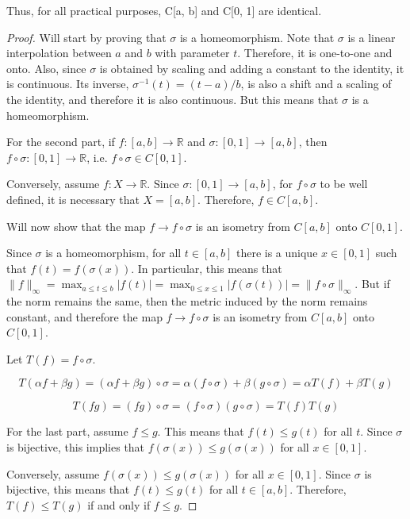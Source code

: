 Thus, for all  practical  purposes, C[a, b] and C[0, 1] are  identical. 

\begin{proof}
Will start by proving that $\sigma$ is a homeomorphism. Note that $\sigma$ is a linear interpolation between $a$ and $b$ with parameter $t$. Therefore, it is one-to-one and onto. Also, since $\sigma$ is obtained by scaling and adding a constant to the identity, it is continuous. Its inverse, $\sigma^{-1}(t) = (t - a) / b$, is also a shift and a scaling of the identity, and therefore it is also continuous. But this means that $\sigma$ is a homeomorphism.

\vspace{1em}

For the second part, if $f: [a,b] \rightarrow \mathbb{R}$ and $\sigma: [0,1] \rightarrow [a,b]$, then $f \circ \sigma: [0,1] \rightarrow \mathbb{R}$, i.e. $f\circ \sigma \in C[0,1]$.

Conversely, assume $f: X \rightarrow \mathbb{R}$. Since $\sigma: [0,1] \rightarrow [a,b]$, for $f \circ \sigma$ to be well defined, it is necessary that $X = [a,b]$. Therefore, $f \in C[a,b]$.

\vspace{1em}

Will now show that the map $f \rightarrow f \circ \sigma$ is an isometry from $C[a,b]$ onto $C[0,1]$.

Since $\sigma$ is a homeomorphism, for all $t \in [a,b]$ there is a unique $x \in [0,1]$ such that $f(t) = f(\sigma(x))$. In particular, this means that $\|f\|_\infty = \max_{a\leq t \leq b} |f(t)| =   \max_{0\leq x \leq 1} |f(\sigma(t))| = \|f \circ \sigma\|_\infty$. But if the norm remains the same, then the metric induced by the norm remains constant, and therefore the map $f \rightarrow f \circ \sigma$ is an isometry from $C[a,b]$ onto $C[0,1]$.

\vspace{1em}

Let $T(f) = f \circ \sigma$.

$$T(\alpha f + \beta g) = (\alpha f + \beta g) \circ \sigma = \alpha(f \circ \sigma) + \beta(g \circ \sigma) = \alpha T(f) + \beta T(g)$$



$$T(fg) = (fg) \circ \sigma = (f \circ \sigma)(g \circ \sigma) = T(f)T(g) $$


For the last part, assume $f \leq g$. This means that $f(t) \leq g(t)$ for all $t$. Since $\sigma$ is bijective, this implies that $f(\sigma(x)) \leq g(\sigma(x))$ for all $x \in [0,1]$.

Conversely, assume $f(\sigma(x)) \leq g(\sigma(x)) $ for all $x \in [0,1]$. Since $\sigma$ is bijective, this means that $f(t) \leq g(t)$ for all $t \in [a,b]$. Therefore, $T(f) \leq T(g)$ if and only if $f \leq g$.

\end{proof}

